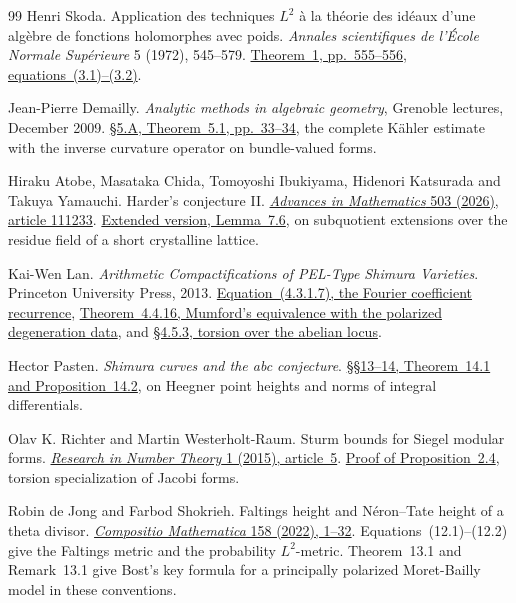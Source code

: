 \begin{thebibliography}{99}
Henri Skoda.
Application des techniques \(L^2\) à la théorie des idéaux
d'une algèbre de fonctions holomorphes avec poids.
\emph{Annales scientifiques de l'École Normale Supérieure}
5 (1972), 545--579.
\href{https://www.numdam.org/article/ASENS_1972_4_5_4_545_0.pdf\#page=11}
{Theorem~1, pp.~555--556, equations~(3.1)--(3.2)}.

Jean-Pierre Demailly.
\emph{Analytic methods in algebraic geometry}, Grenoble lectures,
December 2009.
\href{https://www-fourier.univ-grenoble-alpes.fr/~demailly/manuscripts/analmeth_book.pdf\#page=33}
{\S5.A, Theorem~5.1, pp.~33--34}, the complete Kähler estimate with the inverse
curvature operator on bundle-valued forms.

Hiraku Atobe, Masataka Chida, Tomoyoshi Ibukiyama, Hidenori Katsurada
and Takuya Yamauchi. Harder's conjecture II.
\href{https://doi.org/10.1016/j.aim.2026.111233}
{\emph{Advances in Mathematics} 503 (2026), article 111233}.
\href{https://arxiv.org/pdf/2306.07582v4\#page=25}
{Extended version, Lemma~7.6}, on subquotient extensions over the
residue field of a short crystalline lattice.

Kai-Wen Lan.
\emph{Arithmetic Compactifications of PEL-Type Shimura Varieties}.
Princeton University Press, 2013.
\href{https://www.kwlan.org/articles/cpt-PEL-type-thesis-revision-dense.pdf\#page=96}
{Equation~(4.3.1.7), the Fourier coefficient recurrence},
\href{https://www.kwlan.org/articles/cpt-PEL-type-thesis-revision-dense.pdf\#page=105}
{Theorem~4.4.16, Mumford's equivalence with the polarized degeneration data},
and \href{https://www.kwlan.org/articles/cpt-PEL-type-thesis-revision-dense.pdf\#page=116}
{\S4.5.3, torsion over the abelian locus}.

Hector Pasten.
\emph{Shimura curves and the abc conjecture}.
\href{https://arxiv.org/pdf/1705.09251v4\#page=58}
{\S\S13--14, Theorem~14.1 and Proposition~14.2},
on Heegner point heights and norms of integral differentials.

Olav K. Richter and Martin Westerholt-Raum.
Sturm bounds for Siegel modular forms.
\href{https://doi.org/10.1007/s40993-015-0008-4}
{\emph{Research in Number Theory} 1 (2015), article~5}.
\href{https://arxiv.org/pdf/1501.07733v1\#page=5}
{Proof of Proposition~2.4}, torsion specialization of Jacobi forms.

Robin de Jong and Farbod Shokrieh.
Faltings height and N\'eron--Tate height of a theta divisor.
\href{https://doi.org/10.1112/S0010437X21007661}
{\emph{Compositio Mathematica} 158 (2022), 1--32}.
Equations~(12.1)--(12.2) give the Faltings metric and the
probability \(L^2\)-metric. Theorem~13.1 and Remark~13.1 give
Bost's key formula for a principally polarized Moret-Bailly model
in these conventions.


\end{thebibliography}
